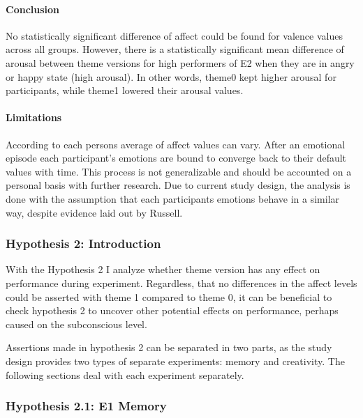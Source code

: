 	\paragraph{Conclusion}
	
	No statistically significant difference of affect could be found for valence values across all groups. However, there is a statistically significant mean difference of arousal between theme versions for high performers of E2 when they are in angry or happy state (high arousal).
	In other words, theme0 kept higher arousal for participants, while theme1 lowered their arousal values.
	
	\paragraph{Limitations} According to \cite{Russell2003} each persons average of affect values can vary. After an emotional episode each participant's emotions are bound to converge back to their default values with time. This process is not generalizable and should be accounted on a personal basis with further research. Due to current study design, the analysis is done with the assumption that each participants emotions behave in a similar way, despite evidence laid out by Russell.
	

%	

	\subsubsection{Hypothesis 2: Introduction}

	With the Hypothesis 2 I analyze whether theme version has any effect on performance during experiment. Regardless, that no differences in the affect levels could be asserted with theme 1 compared to theme 0, it can be beneficial to check hypothesis 2 to uncover other potential effects on performance, perhaps caused on the subconscious level.
	
	Assertions made in hypothesis 2 can be separated in two parts, as the study design provides two types of separate experiments: memory and creativity. The following sections deal with each experiment separately.

	\subsubsection{Hypothesis 2.1: E1 Memory} \label{section:h2e1}
	
